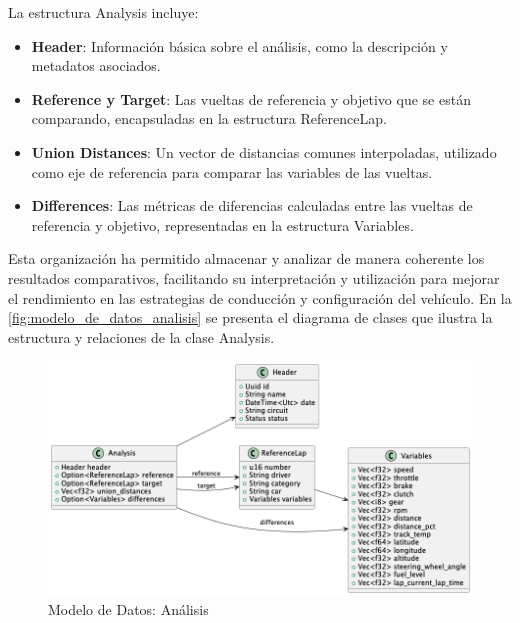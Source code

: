 La estructura Analysis incluye:
\begin{itemize}
    \item \textbf{Header}: Información básica sobre el análisis, como la descripción y metadatos asociados.
    \item \textbf{Reference y Target}: Las vueltas de referencia y objetivo que se están comparando, encapsuladas en la estructura ReferenceLap.
    \item \textbf{Union Distances}: Un vector de distancias comunes interpoladas, utilizado como eje de referencia para comparar las variables de las vueltas.
    \item \textbf{Differences}: Las métricas de diferencias calculadas entre las vueltas de referencia y objetivo, representadas en la estructura Variables.
\end{itemize}


Esta organización ha permitido almacenar y analizar de manera coherente los resultados comparativos, facilitando su interpretación y utilización para mejorar el rendimiento en las estrategias de conducción y configuración del vehículo. En la  \autoref{fig:modelo_de_datos_analisis} se presenta el diagrama de clases que ilustra la estructura y relaciones de la clase Analysis.

\begin{figure}[H]
	\centering
	\includegraphics[width=1\linewidth]{./figs/herramientas/desarrollo/modelo_de_datos_analisis.png}
	\caption[Modelo de Datos Datos: Análisis]{Modelo de Datos: Análisis}
    \label{fig:modelo_de_datos_analisis}
\end{figure}

